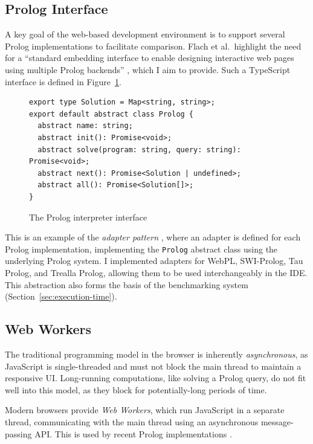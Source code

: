 \subsection{Prolog Interface}

\label{sec:prolog-interface}

A key goal of the web-based development environment is to support several Prolog implementations to facilitate comparison. Flach et al.\ highlight the need for a ``standard embedding interface to enable designing interactive web pages using multiple Prolog backends'' \cite{flachSimplyLogicalFirst2023}, which I aim to provide. Such a TypeScript interface is defined in Figure~\ref{fig:prolog-interface}.

\begin{figure}[H]
\centering
\begin{verbatim}
export type Solution = Map<string, string>;
export default abstract class Prolog {
  abstract name: string;
  abstract init(): Promise<void>;
  abstract solve(program: string, query: string): Promise<void>;
  abstract next(): Promise<Solution | undefined>;
  abstract all(): Promise<Solution[]>;
}
\end{verbatim}
\caption{The Prolog interpreter interface}
\label{fig:prolog-interface}
\end{figure}

\vspace*{-1.5em}

This is an example of the \emph{adapter pattern} \cite{gammaDesignPatternsElements1995}, where an adapter is defined for each Prolog implementation, implementing the \texttt{Prolog} abstract class using the underlying Prolog system. I implemented adapters for WebPL, SWI-Prolog, Tau Prolog, and Trealla Prolog, allowing them to be used interchangeably in the IDE. This abstraction also forms the basis of the benchmarking system (Section~\ref{sec:execution-time}).

\subsection{Web Workers}

The traditional programming model in the browser is inherently \emph{asynchronous}, as JavaScript is single-threaded and must not block the main thread to maintain a responsive UI. Long-running computations, like solving a Prolog query, do not fit well into this model, as they block for potentially-long periods of time.

Modern browsers provide \emph{Web Workers}, which run JavaScript in a separate thread, communicating with the main thread using an asynchronous message-passing API. This is used by recent Prolog implementations \cite{garcia-pradalessCASPInBrowserPlayground2022, riazaTauPrologProlog2024}.

